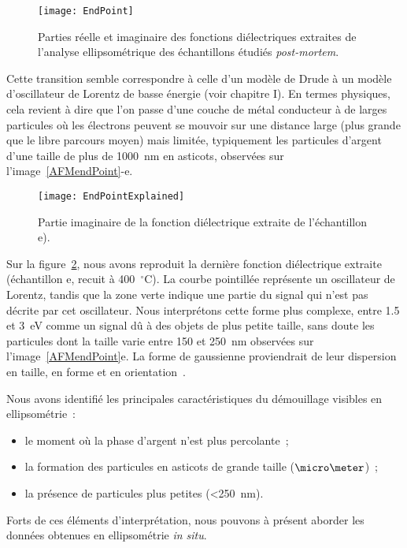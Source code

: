 \begin{figure}[h]
	\centering
	\texttt{[image: EndPoint]}
	\caption{Parties réelle et imaginaire des fonctions diélectriques extraites de l'analyse ellipsométrique des échantillons étudiés \textit{post-mortem}.}
	\label{endPoint}
\end{figure}


Cette transition semble correspondre à celle d'un modèle de Drude à un modèle d'oscillateur de Lorentz de basse énergie (voir chapitre I). En termes physiques, cela revient à dire que l'on passe d'une couche de métal conducteur à de larges particules où les électrons peuvent se mouvoir sur une distance large (plus grande que le libre parcours moyen) mais limitée, typiquement les particules d'argent d'une taille de plus de 1000~nm en asticots, observées sur l'image~\ref{AFMendPoint}-e.\par

\begin{figure}[h]
	\centering
	\texttt{[image: EndPointExplained]}
	\caption{Partie imaginaire de la fonction diélectrique extraite de l'échantillon e).}
	\label{endPointExplained}
\end{figure}

Sur la figure~\ref{endPointExplained}, nous avons reproduit la dernière fonction diélectrique extraite (échantillon e, recuit à 400~$^\circ$C). La courbe pointillée représente un oscillateur de Lorentz, tandis que la zone verte indique une partie du signal qui n'est pas décrite par cet oscillateur. Nous interprétons cette forme plus complexe, entre 1.5 et 3~eV comme un signal dû à des objets de plus petite taille, sans doute les particules dont la taille varie entre 150 et 250~nm observées sur l'image~\ref{AFMendPoint}e. La forme de gaussienne proviendrait de leur dispersion en taille, en forme et en orientation~\cite{oates2005evolution}.\par

Nous avons identifié les principales caractéristiques du démouillage visibles en ellipsométrie~: 
\begin{itemize}
\item le moment où la phase d'argent n'est plus percolante~;
\item la formation des particules en asticots de grande taille ($\micro\meter$)~;
\item la présence de particules plus petites (<250~nm).
\end{itemize}
Forts de ces éléments d'interprétation, nous pouvons à présent aborder les données obtenues en ellipsométrie \textit{in situ}.\par

